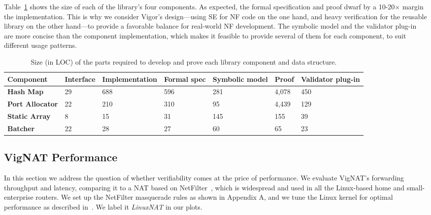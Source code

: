 \documentclass[letterpaper,twocolumn,10pt]{article}
\newcommand{\vignat}{{\sc VigNAT}\xspace}
\begin{document}
{Table~\ref{tab:loc} shows the size of each of the library's four components.  As expected, the formal specification and proof dwarf by a 10-20$\times$ margin the implementation.  This is why we consider Vigor's design---using SE for NF code on the one hand, and heavy verification for the reusable library on the other hand---to provide a favorable balance for real-world NF development.  The symbolic model and the validator plug-in are more concise than the component implementation, which makes it feasible to provide several of them for each component, to suit different usage patterns.


\begin{table}[h!]
\centering
\caption{Size (in LOC) of the parts required to develop and prove each  library component and data structure.}
\label{tab:loc}
\begin{tabular}{lllllll}
\hline
  Component             & Interface & Implementation & Formal spec & Symbolic model & Proof & Validator plug-in \\ \hline
{\bf Hash Map}        & 29         & 688            & 596                  & 281            & 4,078         & 450              \\
{\bf Port Allocator} & 22         & 210            & 310                  & 95             & 4,439         & 129              \\
{\bf Static Array}   & 8          & 15             & 31                   & 145            & 155          & 39               \\
{\bf Batcher}        & 22         & 28             & 27                   & 60             & 65           & 23               \\ \hline
\end{tabular}
\end{table}

\subsection{\vignat Performance}
\label{sec:performance}

In this section we address the question of whether verifiability comes at the price of performance. We evaluate \vignat's forwarding throughput and latency, comparing it to a NAT based on  NetFilter~\cite{boye2013netfilter}, which is widespread and used in all the Linux-based home and small-enterprise routers. We set up the NetFilter masquerade rules as shown in Appendix A, and we tune the Linux kernel for optimal performance as described in~\cite{nf-testing}. We label it {\em LinuxNAT} in our plots.

}
\end{document}

